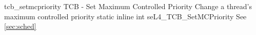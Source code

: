 %
%
%
%

\apidoc
{tcb_setmcpriority}
{TCB - Set Maximum Controlled Priority}
{Change a thread's maximum controlled priority}
{static inline int seL4\_TCB\_SetMCPriority }
{
}
{\errorenumdesc}
{See \autoref{sec:sched}}
